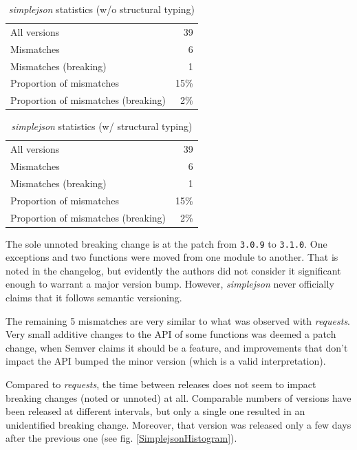 \documentclass{l4proj}
\newcommand\genericstyle{\lstset{basicstyle=\ttm}}
\newcommand\codeinline[1]{{\genericstyle\lstinline!#1!}}
\begin{document}
\noindent
\begin{minipage}[t]{0.5\textwidth}
\begin{table}[H]
\centering
\begin{tabular}{|lr|}
All versions & 39 \\
Mismatches & 6 \\
Mismatches (breaking) & 1 \\
Proportion of mismatches & 15\% \\
Proportion of mismatches (breaking) & 2\%
\end{tabular}
\caption{\textit{simplejson} statistics (w/o structural typing)}
\label{SimplejsonNonStructural}
\end{table}
\end{minipage}
\begin{minipage}[t]{0.5\textwidth}
\begin{table}[H]
\centering
\begin{tabular}{|lr|}
All versions & 39 \\
Mismatches & 6 \\
Mismatches (breaking) & 1 \\
Proportion of mismatches & 15\% \\
Proportion of mismatches (breaking) & 2\%
\end{tabular}
\caption{\textit{simplejson} statistics (w/ structural typing)}
\label{SimplejsonStructural}
\end{table}
\end{minipage}

The sole unnoted breaking change is at the patch from
\codeinline{3.0.9} to \codeinline{3.1.0}. One exceptions and two
functions were moved from one module to another. That is noted in the
changelog, but evidently the authors did not consider it significant
enough to warrant a major version bump. However, \textit{simplejson}
never officially claims that it follows semantic versioning.

The remaining 5 mismatches are very similar to what was observed with
\textit{requests}. Very small additive changes to the API of some
functions was deemed a patch change, when Semver claims it should be a
feature, and improvements that don't impact the API bumped the minor
version (which is a valid interpretation).

Compared to \textit{requests}, the time between releases does not seem
to impact breaking changes (noted or unnoted) at all. Comparable
numbers of versions have been released at different intervals, but
only a single one resulted in an unidentified breaking change.
Moreover, that version was released only a few days after the previous
one (see fig. \ref{SimplejsonHistogram}).
\end{document}
